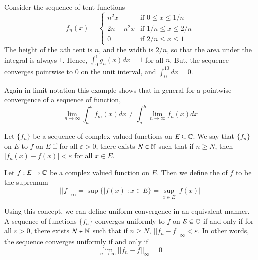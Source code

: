 \begin{example}
    Consider the sequence of tent functions \begin{equation*}
        f_n(x) = \left\{\begin{array}{lc} n^2x & \text{if } 0 \leq x \leq 1/n \\ 2n-n^2x & \text{if } 1/n \leq x \leq 2/n \\ 0 & \text{if } 2/n \leq x \leq 1 \end{array}\right.
    \end{equation*}
    The height of the $n$th tent is $n$, and the width is $2/n$, so that the area under the integral is always $1$. Hence, $\int_0^1g_n(x)dx = 1$ for all $n$. But, the sequence converges pointwise to $0$ on the unit interval, and $\int_0^10dx = 0$.
\end{example}

Again in limit notation this example shows that in general for a pointwise convergence of a sequence of function, $$\lim\limits_{n\rightarrow \infty}\int_a^bf_m(x)dx \neq \int_a^b\lim\limits_{n\rightarrow \infty}f_n(x)dx$$

\begin{definition}
    Let $\{f_n\}$ be a sequence of complex valued functions on $E \subseteq \mathbb C$. We say that $\{f_n\}$  on $E$ to $f$ on $E$ if for all $\varepsilon > 0$, there exists $N \in \mathbb N$ such that if $n \geq N$, then $|f_n(x) - f(x)| < \varepsilon$ for all $x \in E$.
\end{definition}

\begin{definition}
    Let $f:E\rightarrow \mathbb C$ be a complex valued function on $E$. Then we define the  of $f$ to be the supremum \begin{equation*}
        ||f||_{\infty} = \sup\{|f(x)|:x \in E\} = \sup\limits_{x \in E}|f(x)|
    \end{equation*}
\end{definition}

Using this concept, we can define uniform convergence in an equivalent manner. A sequence of functions $\{f_n\}$ converges uniformly to $f$ on $E \subseteq \mathbb C$ if and only if for all $\varepsilon > 0$, there exists $N \in \mathbb N$ such that if $n \geq N$, $||f_n - f||_{\infty} < \varepsilon$. In other words, the sequence converges uniformly if and only if $$\lim\limits_{n\rightarrow \infty}||f_n-f||_{\infty} = 0$$

